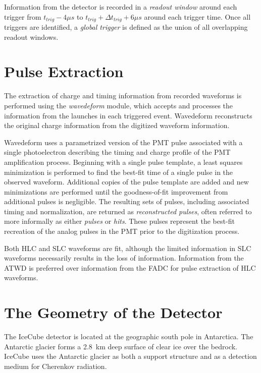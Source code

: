 Information from the detector is recorded in a \emph{readout window} around each trigger from $t_{trig} - 4 \mu s$ to $t_{trig} + \Delta t_{trig} + 6 \mu s$ around each trigger time.
Once all triggers are identified, a \emph{global trigger} is defined as the union of all overlapping readout windows.




\section{Pulse Extraction}
\label{sec:wavedeform}
The extraction of charge and timing information from recorded waveforms is performed using the \emph{wavedeform} module, which accepts and processes the information from the launches in each triggered event.
Wavedeform reconstructs the original charge information from the digitized waveform information.

Wavedeform uses a parametrized version of the PMT pulse associated with a single photoelectron describing the timing and charge profile of the PMT amplification process. 
Beginning with a single pulse template, a least squares minimization is performed to find the best-fit time of a single pulse in the observed waveform.
Additional copies of the pulse template are added and new minimizations are performed until the goodness-of-fit improvement from additional pulses is negligible.
The resulting sets of pulses, including associated timing and normalization, are returned as \emph{reconstructed pulses}, often referred to more informally as either \emph{pulses} or \emph{hits}.
These pulses represent the best-fit recreation of the analog pulses in the PMT prior to the digitization process.

Both HLC and SLC waveforms are fit, although the limited information in SLC waveforms necessarily results in the loss of information.
Information from the ATWD is preferred over information from the FADC for pulse extraction of HLC waveforms.




\section{The Geometry of the Detector}
\label{sec:geometry}
The IceCube detector is located at the geographic south pole in Antarctica.
The Antarctic glacier forms a 2.8~km deep surface of clear ice over the bedrock.
IceCube uses the Antarctic glacier as both a support structure and as a detection medium for Cherenkov radiation.


